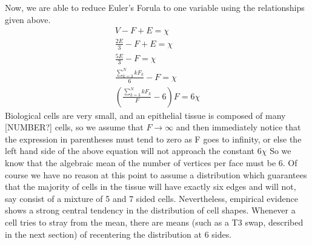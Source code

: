 Now, we are able to reduce Euler's Forula to one variable using the relationships given above.
\begin{gather}
V - F + E = \chi\\
\frac{2E}3 - F + E = \chi\\
\frac{5E}3 - F = \chi\\
\frac{\sum_{k=3}^N kF_k}{6} - F = \chi\\
(\frac{\sum_{k=3}^N kF_k}{F} - 6)F = 6\chi
\end{gather}
Biological cells are very small, and an epithelial tissue is composed of many [NUMBER?] cells, so we assume that $F\to\infty$ and then immediately notice that the expression in parentheses must tend to zero as F goes to infinity, or else the left hand side of the above equation will not approach the constant $6\chi$
So we know that the algebraic mean of the number of vertices per face must be 6. Of course we have no reason at this point to assume a distribution which guarantees that the majority of cells in the tissue will have exactly six edges and will not, say consist of a mixture of 5 and 7 sided cells. Nevertheless, empirical evidence shows a strong central tendency in the distribution of cell shapes. Whenever a cell tries to stray from the mean, there are means (such as a T3 swap, described in the next section) of recentering the distribution at 6 sides. 

